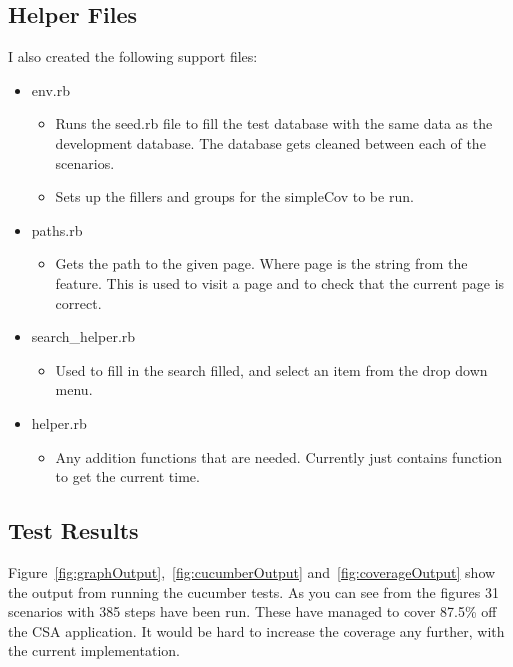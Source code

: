 \documentclass[10pt,a4paper,titlepage]{article}
\begin{document}
\subsection{Helper Files}
I also created the following support files:
\begin{itemize}
\item env.rb
	\begin{itemize}
	\item Runs the seed.rb file to fill the test database with the same data as the development database. The database gets cleaned between each of the scenarios. 
	\item Sets up the fillers and groups for the simpleCov to be run.
	\end{itemize}
\item paths.rb
	\begin{itemize}
	\item Gets the path to the given page. Where page is the string from the feature. This is used to visit a page and to check that the current page is correct.
	\end{itemize}
\item search\_helper.rb
	\begin{itemize}
	\item Used to fill in the search filled, and select an item from the drop down menu.
	\end{itemize}
\item helper.rb
	\begin{itemize}
	\item Any addition functions that are needed. Currently just contains function to get the current time.
	\end{itemize}
\end{itemize}

\subsection{Test Results}

Figure~\ref{fig:graphOutput},~\ref{fig:cucumberOutput} and~\ref{fig:coverageOutput} show the output from running the cucumber tests. As you can see from the figures 31 scenarios with 385 steps have been run. These have managed to cover 87.5\% off the CSA application. It would be hard to increase the coverage any further, with the current implementation.
\end{document}
